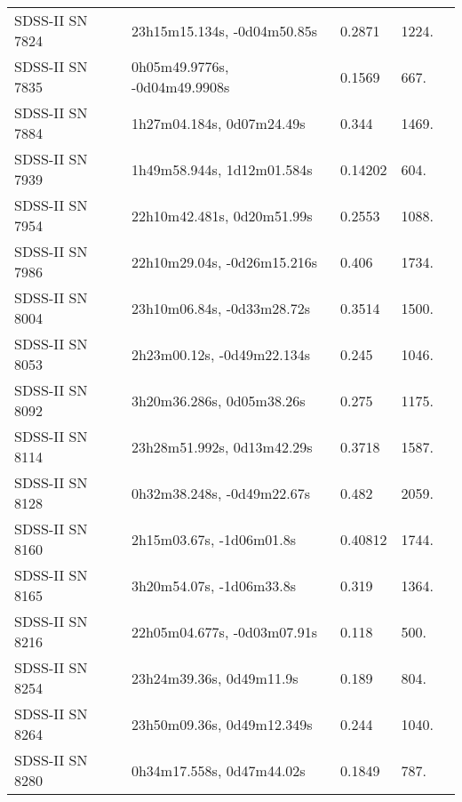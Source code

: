 \begin{longtable}{lllll}
  SDSS-II SN 7824 &    23h15m15.134s, -0d04m50.85s &   0.2871 &          1224. &    \citet{2011ApJ...738..162S} \\
  SDSS-II SN 7835 &  0h05m49.9776s, -0d04m49.9908s &   0.1569 &           667. &    \citet{2016SDSSD.C...0000:} \\
  SDSS-II SN 7884 &      1h27m04.184s, 0d07m24.49s &    0.344 &          1469. &    \citet{2010ApJ...713.1026D} \\
  SDSS-II SN 7939 &     1h49m58.944s, 1d12m01.584s &  0.14202 &           604. &    \citet{2001SDSSe.1...0000:} \\
  SDSS-II SN 7954 &     22h10m42.481s, 0d20m51.99s &   0.2553 &          1088. &    \citet{2011ApJ...738..162S} \\
  SDSS-II SN 7986 &    22h10m29.04s, -0d26m15.216s &    0.406 &          1734. &    \citet{2011ApJ...738..162S} \\
  SDSS-II SN 8004 &     23h10m06.84s, -0d33m28.72s &   0.3514 &          1500. &    \citet{2011ApJ...738..162S} \\
  SDSS-II SN 8053 &     2h23m00.12s, -0d49m22.134s &    0.245 &          1046. &    \citet{2011ApJ...738..162S} \\
  SDSS-II SN 8092 &      3h20m36.286s, 0d05m38.26s &    0.275 &          1175. &    \citet{2011ApJ...738..162S} \\
  SDSS-II SN 8114 &     23h28m51.992s, 0d13m42.29s &   0.3718 &          1587. &    \citet{2011ApJ...738..162S} \\
  SDSS-II SN 8128 &     0h32m38.248s, -0d49m22.67s &    0.482 &          2059. &    \citet{2011ApJ...738..162S} \\
  SDSS-II SN 8160 &       2h15m03.67s, -1d06m01.8s &  0.40812 &          1744. &    \citet{2016SDSSD.C...0000:} \\
  SDSS-II SN 8165 &       3h20m54.07s, -1d06m33.8s &    0.319 &          1364. &    \citet{2010ApJ...713.1026D} \\
  SDSS-II SN 8216 &    22h05m04.677s, -0d03m07.91s &    0.118 &           500. &    \citet{2011ApJ...738..162S} \\
  SDSS-II SN 8254 &       23h24m39.36s, 0d49m11.9s &    0.189 &           804. &    \citet{2011ApJ...738..162S} \\
  SDSS-II SN 8264 &     23h50m09.36s, 0d49m12.349s &    0.244 &          1040. &    \citet{2011ApJ...738..162S} \\
  SDSS-II SN 8280 &      0h34m17.558s, 0d47m44.02s &   0.1849 &           787. &    \citet{2011ApJ...738..162S} \\

\end{longtable}

